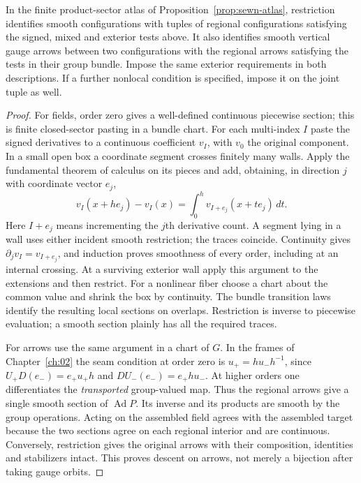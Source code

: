 \begin{theorem}\label{thm:off-shell-descent}
In the finite product-sector atlas of Proposition~\ref{prop:sewn-atlas}, restriction identifies smooth configurations with tuples of regional configurations satisfying the signed, mixed and exterior tests above. It also identifies smooth vertical gauge arrows between two configurations with the regional arrows satisfying the tests in their group bundle. Impose the same exterior requirements in both descriptions. If a further nonlocal condition is specified, impose it on the joint tuple as well.
\end{theorem}
\begin{proof}
For fields, order zero gives a well-defined continuous piecewise section; this is finite closed-sector pasting in a bundle chart. For each multi-index $I$ paste the signed derivatives to a continuous coefficient $v_I$, with $v_0$ the original component. In a small open box a coordinate segment crosses finitely many walls. Apply the fundamental theorem of calculus on its pieces and add, obtaining, in direction $j$ with coordinate vector $e_j$,
\[
 v_I(x+h e_j)-v_I(x)=\int_0^h v_{I+e_j}(x+t e_j)\,dt .
\]
Here $I+e_j$ means incrementing the $j$th derivative count. A segment lying in a wall uses either incident smooth restriction; the traces coincide. Continuity gives $\partial_jv_I=v_{I+e_j}$, and induction proves smoothness of every order, including at an internal crossing. At a surviving exterior wall apply this argument to the extensions and then restrict. For a nonlinear fiber choose a chart about the common value and shrink the box by continuity. The bundle transition laws identify the resulting local sections on overlaps. Restriction is inverse to piecewise evaluation; a smooth section plainly has all the required traces.

For arrows use the same argument in a chart of $G$. In the frames of Chapter~\ref{ch:02} the seam condition at order zero is $u_+=h u_-h^{-1}$, since $U_+D(e_-)=e_+u_+ h$ and $DU_-(e_-)=e_+h u_-$. At higher orders one differentiates the \emph{transported} group-valued map. Thus the regional arrows give a single smooth section of $\operatorname{Ad}P$. Its inverse and its products are smooth by the group operations. Acting on the assembled field agrees with the assembled target because the two sections agree on each regional interior and are continuous. Conversely, restriction gives the original arrows with their composition, identities and stabilizers intact. This proves descent on arrows, not merely a bijection after taking gauge orbits.
\end{proof}

